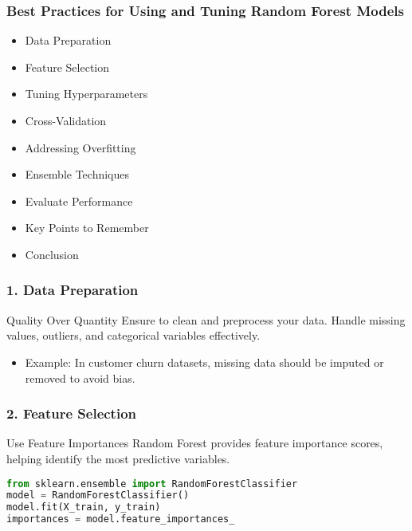 \documentclass[aspectratio=169]{beamer}
\begin{document}
\begin{frame}
    \frametitle{Best Practices for Using and Tuning Random Forest Models}
    \begin{itemize}
        \item Data Preparation
        \item Feature Selection
        \item Tuning Hyperparameters
        \item Cross-Validation
        \item Addressing Overfitting
        \item Ensemble Techniques
        \item Evaluate Performance
        \item Key Points to Remember
        \item Conclusion
    \end{itemize}
\end{frame}

\begin{frame}
    \frametitle{1. Data Preparation}
    \begin{block}{Quality Over Quantity}
        Ensure to clean and preprocess your data.
        Handle missing values, outliers, and categorical variables effectively.
    \end{block}
    \begin{itemize}
        \item Example: In customer churn datasets, missing data should be imputed or removed to avoid bias.
    \end{itemize}
    
    \frametitle{2. Feature Selection}
    \begin{block}{Use Feature Importances}
        Random Forest provides feature importance scores, helping identify the most predictive variables.
    \end{block}
    \begin{lstlisting}[language=Python]
from sklearn.ensemble import RandomForestClassifier
model = RandomForestClassifier()
model.fit(X_train, y_train)
importances = model.feature_importances_
    \end{lstlisting}
\end{frame}
\end{document}
